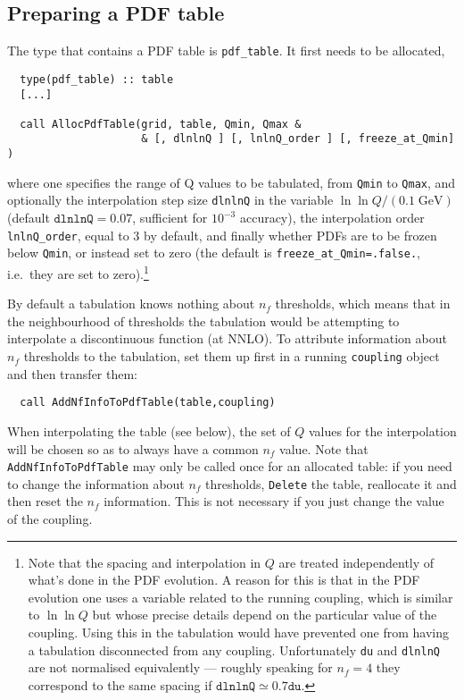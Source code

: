 \documentclass[12pt]{article}
\newcommand{\GeV}{\;\mathrm{GeV}}
\newcommand{\ie}{i.e.\ }
\newcommand{\ttt}[1]{\texttt{#1}}
\begin{document}
\subsection{Preparing a PDF table}
The type that contains a PDF table is \ttt{pdf\_table}. It first needs
to be allocated,
\begin{lstlisting}
  type(pdf_table) :: table
  [...]

  call AllocPdfTable(grid, table, Qmin, Qmax &
                     & [, dlnlnQ ] [, lnlnQ_order ] [, freeze_at_Qmin] )
\end{lstlisting}
where one specifies the range of Q values to be tabulated, from
\ttt{Qmin} to \ttt{Qmax}, and optionally the interpolation step size
\ttt{dlnlnQ} in the variable $\ln \ln Q/(0.1\GeV)$ (default
$\ttt{dlnlnQ}=0.07$, sufficient for $10^{-3}$ accuracy), the
interpolation order \ttt{lnlnQ\_order}, equal to $3$ by default, and
finally whether PDFs are to be frozen below \ttt{Qmin}, or instead set
to zero (the default is \ttt{freeze\_at\_Qmin=.false.}, \ie they are
set to zero).\footnote{Note that the spacing and interpolation in $Q$
  are treated independently of what's done in the PDF evolution. A
  reason for this is that in the PDF evolution one uses a variable
  related to the running coupling, which is similar to $\ln \ln Q$ but
  whose precise details depend on the particular value of the
  coupling.  Using this in the tabulation would have prevented one
  from having a tabulation disconnected from any coupling.
  Unfortunately \ttt{du} and \ttt{dlnlnQ} are not normalised
  equivalently --- roughly speaking for $n_f = 4$ they correspond to
  the same spacing if $\ttt{dlnlnQ} \simeq 0.7 \ttt{du}$.}

By default a tabulation knows nothing about $n_f$ thresholds, which
means that in the neighbourhood of thresholds the tabulation would be
attempting to interpolate a discontinuous function (at NNLO). To
attribute information about $n_f$ thresholds to the tabulation, set
them up first in a running \ttt{coupling} object and then transfer
them:
\begin{lstlisting}
  call AddNfInfoToPdfTable(table,coupling)
\end{lstlisting}
When interpolating the table (see below), the set of $Q$ values for
the interpolation will be chosen so as to always have a common $n_f$
value. Note that \ttt{AddNfInfoToPdfTable} may only be called once for
an allocated table: if you need to change the information about $n_f$
thresholds, \ttt{Delete} the table, reallocate it and then reset the
$n_f$ information. This is not necessary if you just
change the value of the coupling.
\end{document}
